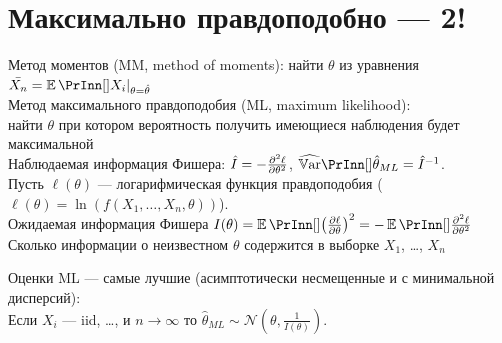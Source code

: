 \documentclass[12pt, a4paper]{article}
\newcommand{\cN}{\mathcal{N}}
\begin{document}
\section{Максимально правдоподобно — 2!}



\begin{leftbar}
Метод моментов (MM, method of moments): найти $\theta$ из уравнения $\bar{X_n}=\E(X_i)|_{\theta=\hat\theta}$ \\
Метод максимального правдоподобия (ML, maximum likelihood): \\
найти $\theta$ при котором вероятность получить имеющиеся наблюдения будет максимальной \\
Наблюдаемая информация Фишера: $\hat{I}=-\pdv[2]{\ell}{\theta}(\hat{\theta})$, $\hVar(\hat{\theta}_{ML})=\hat{I}^{-1}$. \\


Пусть $\ell(\theta)$ — логарифмическая функция правдоподобия ($\ell(\theta)=\ln(f(X_1, \ldots ,X_n,\theta))$). \\
Ожидаемая информация Фишера $I(\theta)=\E(\left(\pdv{\ell}{\theta}\right)^2)=-\E(\pdv[2]{\ell}{\theta})$ \\
Сколько информации о неизвестном $\theta$ содержится в выборке $X_1$, \ldots , $X_n$


Оценки ML — самые лучшие (асимптотически несмещенные и с минимальной дисперсий): \\
Если $X_i$ — iid, \ldots , и $n\to\infty$ то $\hat{\theta}_{ML}\sim \cN(\theta, \frac{1}{I(\theta)})$.
\end{leftbar}

\end{document}
